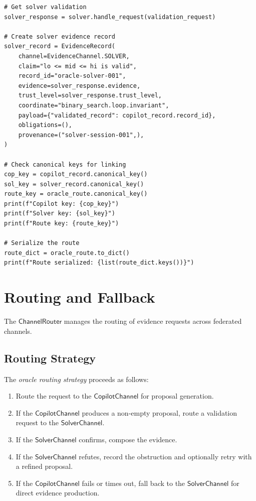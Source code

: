 \documentclass[11pt]{article}
\newcommand{\CopChan}{\mathsf{CopilotChannel}}
\newcommand{\SolChan}{\mathsf{SolverChannel}}
\newcommand{\ChanRouter}{\mathsf{ChannelRouter}}
\begin{document}
\begin{lstlisting}[style=jugeo-python, caption={Evidence records with support routes for oracle federation.}, label=lst:routes]
# Get solver validation
solver_response = solver.handle_request(validation_request)

# Create solver evidence record
solver_record = EvidenceRecord(
    channel=EvidenceChannel.SOLVER,
    claim="lo <= mid <= hi is valid",
    record_id="oracle-solver-001",
    evidence=solver_response.evidence,
    trust_level=solver_response.trust_level,
    coordinate="binary_search.loop.invariant",
    payload={"validated_record": copilot_record.record_id},
    obligations=(),
    provenance=("solver-session-001",),
)

# Check canonical keys for linking
cop_key = copilot_record.canonical_key()
sol_key = solver_record.canonical_key()
route_key = oracle_route.canonical_key()
print(f"Copilot key: {cop_key}")
print(f"Solver key: {sol_key}")
print(f"Route key: {route_key}")

# Serialize the route
route_dict = oracle_route.to_dict()
print(f"Route serialized: {list(route_dict.keys())}")
\end{lstlisting}

\section{Routing and Fallback}
\label{sec:routing}

The $\ChanRouter$ manages the routing of evidence requests
across federated channels.

\subsection{Routing Strategy}
\label{sec:routing:strategy}

\begin{definition}
\label{def:oracle-routing}
The \emph{oracle routing strategy} proceeds as follows:
\begin{enumerate}
\item Route the request to the $\CopChan$ for proposal generation.
\item If the $\CopChan$ produces a non-empty proposal, route a
  validation request to the $\SolChan$.
\item If the $\SolChan$ confirms, compose the evidence.
\item If the $\SolChan$ refutes, record the obstruction and
  optionally retry with a refined proposal.
\item If the $\CopChan$ fails or times out, fall back to the
  $\SolChan$ for direct evidence production.
\end{enumerate}
\end{definition}
\end{document}

